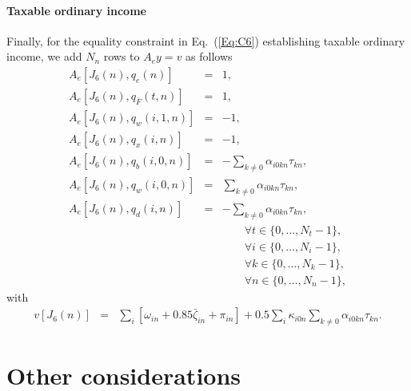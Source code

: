 \documentclass{report}[fleqn,11pt]
\begin{document}
\paragraph*{Taxable ordinary income}
Finally, for the equality constraint in Eq.~(\ref{Eq:C6}) establishing taxable
ordinary income, we add $N_n$ rows to $A_ey = v$ as follows
\begin{eqnarray}
	A_e[J_6(n), q_e(n)] &=& 1, \nonumber \\
	A_e[J_6(n), q_{\bar{F}}(t, n)] &=& 1, \nonumber \\
	A_e[J_6(n), q_w(i, 1, n)] &=& -1, \nonumber \\
	A_e[J_6(n), q_x(i, n)] &=& -1, \nonumber \\
	A_e[J_6(n), q_b(i, 0, n)] &=& -\sum_{k\neq 0} \alpha_{i0kn}\tau_{kn}, \\
	A_e[J_6(n), q_w(i, 0, n)] &=&  \sum_{k\neq 0} \alpha_{i0kn}\tau_{kn}, \nonumber \\
	A_e[J_6(n), q_d(i, n)] &=&    -\sum_{k\neq 0} \alpha_{i0kn}\tau_{kn}, \nonumber \\
	&&\qquad\forall t \in \{0,\ldots, N_t-1\},\nonumber\\
	&&\qquad\forall i \in \{0,\ldots, N_i-1\},\nonumber\\
	&&\qquad\forall k \in \{0,\ldots, N_k-1\},\nonumber\\
	&&\qquad\forall n \in \{0,\ldots, N_n-1\}, \nonumber
\end{eqnarray}
with
\begin{eqnarray}
	v[J_6(n)] &=& 
	\sum_i [\omega_{in} + 0.85\bar\zeta_{in}  + \pi_{in}]
	+ 0.5\sum_{i} \kappa_{i0n} \sum_{k\neq 0} \alpha_{i0kn}\tau_{kn}.
\end{eqnarray}

\section{Other considerations}
\end{document}
